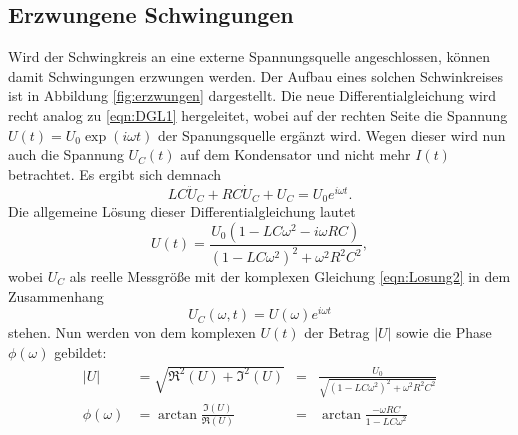 \subsection{Erzwungene Schwingungen}
Wird der Schwingkreis an eine externe Spannungsquelle angeschlossen, können damit Schwingungen erzwungen werden. Der Aufbau eines solchen Schwinkreises
ist in Abbildung \ref{fig:erzwungen} dargestellt. Die neue Differentialgleichung wird recht analog zu \eqref{eqn:DGL1} hergeleitet, wobei auf der 
rechten Seite die Spannung $U(t)=U_0\exp(i\omega t)$ der Spanungsquelle ergänzt wird. Wegen dieser wird nun auch die Spannung $U_C(t)$ auf dem Kondensator
 und nicht mehr $I(t)$ betrachtet. Es ergibt sich demnach
\begin{equation}
    LC\ddot{U}_C+RC\dot{U}_C+U_C=U_0e^{i\omega t}   .
    \label{eqn:DGL2}
\end{equation}
Die allgemeine Lösung dieser Differentialgleichung lautet
\begin{equation}
    U(t)=\frac{U_0(1-LC\omega^2-i\omega RC)}{(1-LC\omega^2)^2+\omega^2R^2C^2}   ,
    \label{ref:Losung2}
\end{equation}
wobei $U_C$ als reelle Messgröße mit der komplexen Gleichung \eqref{eqn:Losung2} in dem Zusammenhang
\begin{equation*}
    U_C(\omega,t)=U(\omega)e^{i\omega t}
\end{equation*} 
stehen. Nun werden von dem komplexen $U(t)$ der Betrag $|U|$ sowie die Phase $\phi(\omega)$ gebildet:
\begin{align}
    |U|          &= \sqrt{\Re^2(U)+\Im^2(U)}&=& \frac{U_0}{\sqrt{(1-LC\omega^2)^2+\omega^2R^2C^2}} \\
    \phi(\omega) &= \arctan{\frac{\Im(U)}{\Re(U)}}&=& \arctan{\frac{-\omega RC}{1-LC\omega^2}}
\end{align}